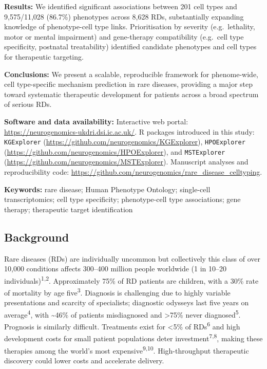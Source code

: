 \documentclass[
]{article}
\begin{document}
\textbf{Results:} We identified significant associations between 201
cell types and 9,575/11,028 (86.7\%) phenotypes across 8,628 RDs,
substantially expanding knowledge of phenotype-cell type links.
Prioritisation by severity (e.g.~lethality, motor or mental impairment)
and gene-therapy compatibility (e.g.~cell type specificity, postnatal
treatability) identified candidate phenotypes and cell types for
therapeutic targeting.

\textbf{Conclusions:} We present a scalable, reproducible framework for
phenome-wide, cell type-specific mechanism prediction in rare diseases,
providing a major step toward systematic therapeutic development for
patients across a broad spectrum of serious RDs.

\textbf{Software and data availability:} Interactive web portal:
\url{https://neurogenomics-ukdri.dsi.ic.ac.uk/}. R packages introduced
in this study: \texttt{KGExplorer}
(\url{https://github.com/neurogenomics/KGExplorer}),
\texttt{HPOExplorer}
(\url{https://github.com/neurogenomics/HPOExplorer}), and
\texttt{MSTExplorer}
(\url{https://github.com/neurogenomics/MSTExplorer}). Manuscript
analyses and reproducibility code:
\url{https://github.com/neurogenomics/rare_disease_celltyping}.

\textbf{Keywords:} rare disease; Human Phenotype Ontology; single-cell
transcriptomics; cell type specificity; phenotype-cell type
associations; gene therapy; therapeutic target identification

\subsection{Background}\label{sec-background}

Rare diseases (RDs) are individually uncommon but collectively this
class of over 10,000 conditions affects 300--400 million people
worldwide (1 in 10--20 individuals)\textsuperscript{1,2}. Approximately
75\% of RD patients are children, with a 30\% rate of mortality by age
five\textsuperscript{3}. Diagnosis is challenging due to highly variable
presentations and scarcity of specialists; diagnostic odysseys last five
years on average\textsuperscript{4}, with \textasciitilde46\% of
patients misdiagnosed and \textgreater75\% never
diagnosed\textsuperscript{5}. Prognosis is similarly difficult.
Treatments exist for \textless5\% of RDs\textsuperscript{6} and high
development costs for small patient populations deter
investment\textsuperscript{7,8}, making these therapies among the
world's most expensive\textsuperscript{9,10}. High-throughput
therapeutic discovery could lower costs and accelerate delivery.
\end{document}
